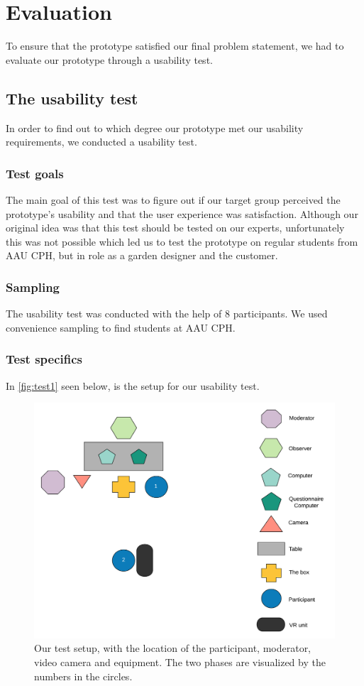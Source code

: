 \chapter{Evaluation}
To ensure that the prototype satisfied our final problem statement, we had to evaluate our prototype through a usability test. 

\section{The usability test}
In order to find out to which degree our prototype met our usability requirements, we conducted a usability test.

\subsection{Test goals}
The main goal of this test was to figure out if our target group perceived the prototype's usability and that the user experience was satisfaction. Although our original idea was that this test should be tested on our experts, unfortunately this was not possible which led us to test the prototype on regular students from AAU CPH, but in role as a garden designer and the customer.\\


\subsection{Sampling}
The usability test was conducted with the help of 8 participants. We used convenience sampling to find students at AAU CPH.

\subsection{Test specifics}
In \autoref{fig:test1} seen below, is the setup for our usability test.

\begin{figure}[H]
	\centering
	\includegraphics[width=1\linewidth]{figure/Evaluation/Test1.png}
	\caption{Our test setup, with the location of the participant, moderator, video camera and equipment. The two phases are visualized by the numbers in the circles.}
	\label{fig:test1}
\end{figure}

